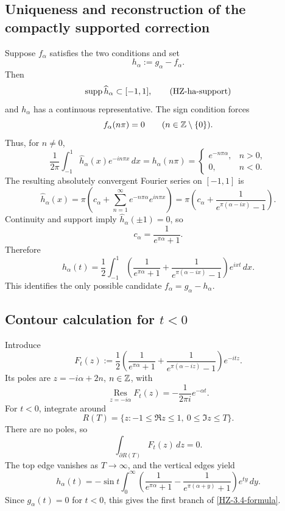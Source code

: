 \subsection{Uniqueness and reconstruction of the compactly supported correction}

Suppose $f_\alpha$ satisfies the two conditions and set
\[
  h_\alpha:=g_\alpha-f_\alpha.
\]
Then
\[
  \operatorname{supp}\widehat h_\alpha\subset[-1,1],
  \tag{HZ-ha-support}\label{HZ-ha-support}
\]
and $h_\alpha$ has a continuous representative. The sign condition forces
\[
  f_\alpha(n\pi)=0\qquad(n\in\mathbb{Z}\setminus\{0\}).
\]
Thus, for $n\ne0$,
\[
  \frac1{2\pi}\int_{-1}^{1}\widehat h_\alpha(x)e^{-in\pi x}\,dx
  =h_\alpha(n\pi)
  =
  \begin{cases}
    e^{-n\pi\alpha},&n>0,\\
    0,&n<0.
  \end{cases}
  \tag{HZ-3.4-coeff}\label{HZ-3.4-coeff}
\]
The resulting absolutely convergent Fourier series on $[-1,1]$ is
\[
  \widehat h_\alpha(x)
  =\pi\left(c_\alpha+\sum_{n=1}^\infty
       e^{-n\pi\alpha}e^{in\pi x}\right)
  =\pi\left(c_\alpha+
       \frac1{e^{\pi(\alpha-ix)}-1}\right).
  \tag{HZ-3.4-series}\label{HZ-3.4-series}
\]
Continuity and support imply $\widehat h_\alpha(\pm1)=0$, so
\[
  c_\alpha=\frac1{e^{\pi\alpha}+1}.
  \tag{HZ-calpha}\label{HZ-calpha}
\]
Therefore
\[
  h_\alpha(t)
  =\frac12\int_{-1}^{1}
   \left(
    \frac1{e^{\pi\alpha}+1}
    +\frac1{e^{\pi(\alpha-ix)}-1}
   \right)e^{ixt}\,dx.
  \tag{HZ-3.4-h}\label{HZ-3.4-h}
\]
This identifies the only possible candidate $f_\alpha=g_\alpha-h_\alpha$.

\subsection{Contour calculation for \texorpdfstring{$t<0$}{t less than 0}}

Introduce
\[
  F_t(z):=\frac12\left(
    \frac1{e^{\pi\alpha}+1}
    +\frac1{e^{\pi(\alpha-iz)}-1}
  \right)e^{-itz}.
  \tag{HZ-meromorphic}\label{HZ-meromorphic}
\]
Its poles are $z=-i\alpha+2n$, $n\in\mathbb{Z}$, with
\[
  \operatorname*{Res}_{z=-i\alpha}F_t(z)
  =-\frac{1}{2\pi i}e^{-\alpha t}.
  \tag{HZ-residue}\label{HZ-residue}
\]
For $t<0$, integrate around
\[
  R(T)=\{z:-1\le\Re z\le1,\ 0\le\Im z\le T\}.
\]
There are no poles, so
\[
  \int_{\partial R(T)}F_t(z)\,dz=0.
  \tag{HZ-contour-up}\label{HZ-contour-up}
\]
The top edge vanishes as $T\to\infty$, and the vertical edges yield
\[
  h_\alpha(t)
  =-\sin t\int_0^\infty
    \left(\frac1{e^{\pi\alpha}+1}
          -\frac1{e^{\pi(\alpha+y)}+1}
    \right)e^{ty}\,dy.
  \tag{HZ-v}\label{HZ-v}
\]
Since $g_\alpha(t)=0$ for $t<0$, this gives the first branch of \eqref{HZ-3.4-formula}.


